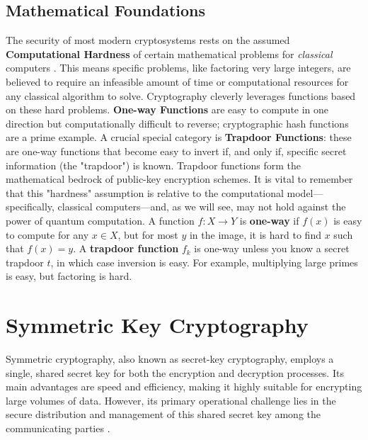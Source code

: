 \subsection{Mathematical Foundations}
The security of most modern cryptosystems rests on the assumed \textbf{Computational Hardness} of certain mathematical problems for \textit{classical} computers \parencite{katz2014introduction}. This means specific problems, like factoring very large integers, are believed to require an infeasible amount of time or computational resources for any classical algorithm to solve. Cryptography cleverly leverages functions based on these hard problems. \textbf{One-way Functions} are easy to compute in one direction but computationally difficult to reverse; cryptographic hash functions are a prime example. A crucial special category is \textbf{Trapdoor Functions}: these are one-way functions that become easy to invert if, and only if, specific secret information (the "trapdoor") is known. Trapdoor functions form the mathematical bedrock of public-key encryption schemes. It is vital to remember that this "hardness" assumption is relative to the computational model—specifically, classical computers—and, as we will see, may not hold against the power of quantum computation. A function $f: X \to Y$ is \textbf{one-way} if $f(x)$ is easy to compute for any $x \in X$, but for most $y$ in the image, it is hard to find $x$ such that $f(x) = y$. A \textbf{trapdoor function} $f_k$ is one-way unless you know a secret trapdoor $t$, in which case inversion is easy. For example, multiplying large primes is easy, but factoring is hard.

\section{Symmetric Key Cryptography}\label{sec:symmetric_key_ch3}

Symmetric cryptography, also known as secret-key cryptography, employs a single, shared secret key for both the encryption and decryption processes. Its main advantages are speed and efficiency, making it highly suitable for encrypting large volumes of data. However, its primary operational challenge lies in the secure distribution and management of this shared secret key among the communicating parties \parencite{katz2014introduction}.

